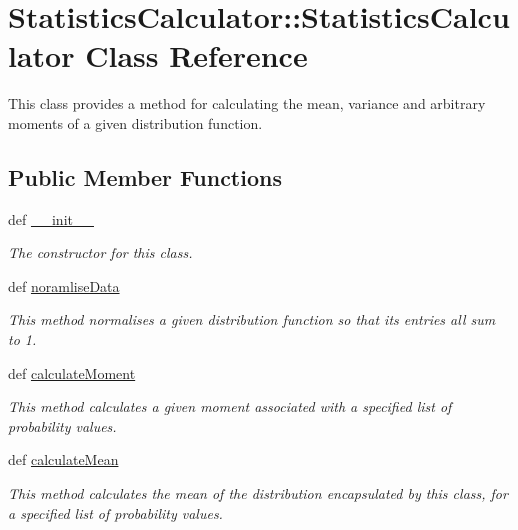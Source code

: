 \hypertarget{class_statistics_calculator_1_1_statistics_calculator}{
\section{StatisticsCalculator::StatisticsCalculator Class Reference}
\label{class_statistics_calculator_1_1_statistics_calculator}
}


This class provides a method for calculating the mean, variance and arbitrary moments of a given distribution function.  


\subsection*{Public Member Functions}
\begin{DoxyCompactItemize}
\item 
def \hyperlink{class_statistics_calculator_1_1_statistics_calculator_ab0c6137e7912f4ae798297af58b943c8}{\_\-\_\-init\_\-\_\-}
\begin{DoxyCompactList}\small\item\em The constructor for this class. \item\end{DoxyCompactList}\item 
def \hyperlink{class_statistics_calculator_1_1_statistics_calculator_a188000e6ceba9bdb0a0e3205c71c3149}{noramliseData}
\begin{DoxyCompactList}\small\item\em This method normalises a given distribution function so that its entries all sum to 1. \item\end{DoxyCompactList}\item 
def \hyperlink{class_statistics_calculator_1_1_statistics_calculator_a28a27db67f609d3d909b58c33900ba5e}{calculateMoment}
\begin{DoxyCompactList}\small\item\em This method calculates a given moment associated with a specified list of probability values. \item\end{DoxyCompactList}\item 
def \hyperlink{class_statistics_calculator_1_1_statistics_calculator_acfa437d9d93d9bc53d6d2ab4e8528b64}{calculateMean}
\begin{DoxyCompactList}\small\item\em This method calculates the mean of the distribution encapsulated by this class, for a specified list of probability values. \item\end{DoxyCompactList}\item 

\end{DoxyCompactItemize}
